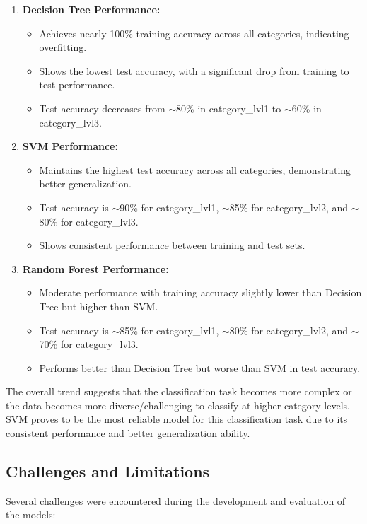 \documentclass[10pt]{article}
\begin{document}
\begin{enumerate}
    \item \textbf{Decision Tree Performance:}
    \begin{itemize}
        \item Achieves nearly 100\% training accuracy across all categories, indicating overfitting.
        \item Shows the lowest test accuracy, with a significant drop from training to test performance.
        \item Test accuracy decreases from $\sim$80\% in category\_lvl1 to $\sim$60\% in category\_lvl3.
    \end{itemize}
    
    \item \textbf{SVM Performance:}
    \begin{itemize}
        \item Maintains the highest test accuracy across all categories, demonstrating better generalization.
        \item Test accuracy is $\sim$90\% for category\_lvl1, $\sim$85\% for category\_lvl2, and $\sim$80\% for category\_lvl3.
        \item Shows consistent performance between training and test sets.
    \end{itemize}
    
    \item \textbf{Random Forest Performance:}
    \begin{itemize}
        \item Moderate performance with training accuracy slightly lower than Decision Tree but higher than SVM.
        \item Test accuracy is $\sim$85\% for category\_lvl1, $\sim$80\% for category\_lvl2, and $\sim$70\% for category\_lvl3.
        \item Performs better than Decision Tree but worse than SVM in test accuracy.
    \end{itemize}
\end{enumerate}

The overall trend suggests that the classification task becomes more complex or the data becomes more diverse/challenging to classify at higher category levels. SVM proves to be the most reliable model for this classification task due to its consistent performance and better generalization ability.

\subsection{Challenges and Limitations}
Several challenges were encountered during the development and evaluation of the models:
\end{document}
